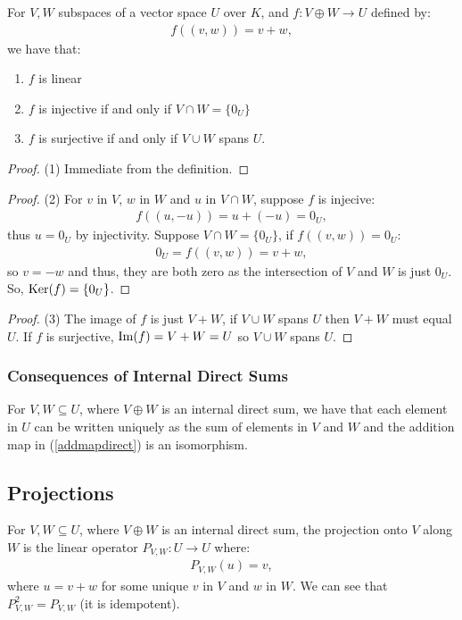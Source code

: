 For $V, W$ subspaces of a vector space $U$ over $K$, and $f : V \oplus W \to U$
defined by: \begin{gather*}
  f((v, w)) = v + w,
\end{gather*} we have that: \begin{enumerate}
  \item $f$ is linear
  \item $f$ is injective if and only if $V \cap W = \{0_U\}$
  \item $f$ is surjective if and only if $V \cup W$ spans $U$.
\end{enumerate}
\begin{proof}
    (1) Immediate from the definition.
\end{proof}
\begin{proof}
    (2) For $v$ in $V$, $w$ in $W$ and $u$ in $V \cap W$, suppose $f$ is 
    injecive: \begin{align*}
        f((u, -u)) = u + (-u) = 0_U,
    \end{align*} thus $u = 0_U$ by injectivity. Suppose $V \cap W = \{0_U\}$,
    if $f((v, w)) = 0_U$: \begin{gather*}
        0_U = f((v, w)) = v + w,
    \end{gather*} so $v = -w$ and thus, they are both zero as the
    intersection of $V$ and $W$ is just $0_U$. So, $\operatorname{Ker}(f) = \{0_U\}$.
\end{proof}
\begin{proof}
    (3) The image of $f$ is just $V + W$, if $V \cup W$ spans $U$ then
    $V + W$ must equal $U$. If $f$ is surjective, $\operatorname{Im}(f) = V + W = U$
    so $V \cup W$ spans $U$.
\end{proof}

\subsubsection{Consequences of Internal Direct Sums}

For $V, W \subseteq U$, where $V \oplus W$ is an internal direct sum,
we have that each element in $U$ can be written uniquely as the sum
of elements in $V$ and $W$ and the addition map in (\ref{addmapdirect})
is an isomorphism.

\subsection{Projections}

For $V, W \subseteq U$, where $V \oplus W$ is an internal direct sum,
the projection onto $V$ along $W$ is the linear operator 
$P_{V, W} : U \to U$ where: \begin{gather*}
  P_{V, W}(u) = v,
\end{gather*} where $u = v + w$ for some unique $v$ in $V$ and
$w$ in $W$. We can see that $P_{V, W}^2 = P_{V, W}$ (it is idempotent).

